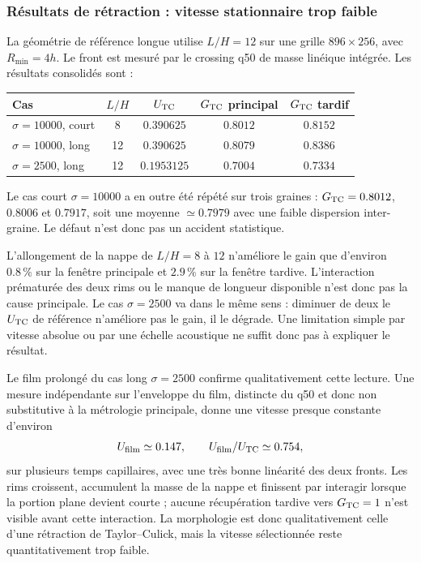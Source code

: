 \documentclass[11pt,a4paper]{article}
\begin{document}
\subsubsection{Résultats de rétraction : vitesse stationnaire trop faible}

La géométrie de référence longue utilise $L/H=12$ sur une grille $896\times256$, avec $R_{\min}=4h$. Le front est mesuré par le crossing q50 de masse linéique intégrée. Les résultats consolidés sont :
\begin{center}
\begin{tabular}{lcccc}
\toprule
Cas & $L/H$ & $U_{\rm TC}$ & $G_{\rm TC}$ principal & $G_{\rm TC}$ tardif \\
\midrule
$\sigma=10000$, court & 8  & $0.390625$  & $0.8012$ & $0.8152$ \\
$\sigma=10000$, long  & 12 & $0.390625$  & $0.8079$ & $0.8386$ \\
$\sigma=2500$, long   & 12 & $0.1953125$ & $0.7004$ & $0.7334$ \\
\bottomrule
\end{tabular}
\end{center}
Le cas court $\sigma=10000$ a en outre été répété sur trois graines : $G_{\rm TC}=0.8012$, $0.8006$ et $0.7917$, soit une moyenne $\simeq0.7979$ avec une faible dispersion inter-graine. Le défaut n'est donc pas un accident statistique.

L'allongement de la nappe de $L/H=8$ à $12$ n'améliore le gain que d'environ $0.8\,\%$ sur la fenêtre principale et $2.9\,\%$ sur la fenêtre tardive. L'interaction prématurée des deux rims ou le manque de longueur disponible n'est donc pas la cause principale. Le cas $\sigma=2500$ va dans le même sens : diminuer de deux le $U_{\rm TC}$ de référence n'améliore pas le gain, il le dégrade. Une limitation simple par vitesse absolue ou par une échelle acoustique ne suffit donc pas à expliquer le résultat.

Le film prolongé du cas long $\sigma=2500$ confirme qualitativement cette lecture. Une mesure indépendante sur l'enveloppe du film, distincte du q50 et donc non substitutive à la métrologie principale, donne une vitesse presque constante d'environ
\begin{equation}
  U_{\rm film}\simeq0.147,
  \qquad
  U_{\rm film}/U_{\rm TC}\simeq0.754,
\end{equation}
sur plusieurs temps capillaires, avec une très bonne linéarité des deux fronts. Les rims croissent, accumulent la masse de la nappe et finissent par interagir lorsque la portion plane devient courte ; aucune récupération tardive vers $G_{\rm TC}=1$ n'est visible avant cette interaction. La morphologie est donc qualitativement celle d'une rétraction de Taylor--Culick, mais la vitesse sélectionnée reste quantitativement trop faible.
\end{document}
